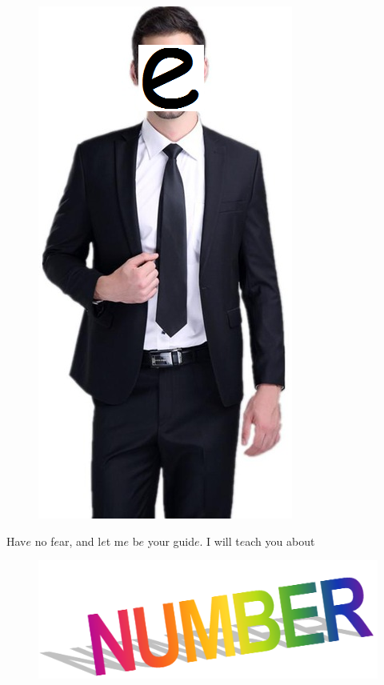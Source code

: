 \documentclass[12pt,a4paper]{amsart}
\theoremstyle{definition}
\theoremstyle{remark}
\begin{document}
\begin{center}
  \begin{figure}[ht] 
    \includegraphics[width=.5\linewidth]{suit.png}
  \end{figure}
{\Large
Hav$e$ no f$e$ar, and l$e$t m$e$ b$e$ your guid$e$. I will t$e$ach you 
about}
\begin{figure}[ht]
  \includegraphics[width=.4\linewidth]{number.png}
\end{figure}
\end{center}
\newpage
\end{document}
